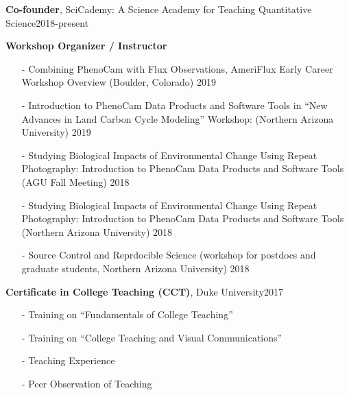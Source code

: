 \documentclass[10pt]{article}
\newenvironment{changemargin}[2]{%
  \begin{list}{}{%
 \setlength{\topsep}{0pt}%
 \setlength{\leftmargin}{#1}%
 \setlength{\rightmargin}{#2}%
 \setlength{\listparindent}{\parindent}%
 \setlength{\itemindent}{\parindent}%
 \setlength{\parsep}{\parskip}%
  }%
  \item[]}{\end{list}
}
\newenvironment{body} {
  \vspace*{-2pt}
  \begin{changemargin}{-0.5in}{-0.5in}
}
{\end{changemargin}
}
\begin{document}
\begin{body}

  \textbf{Co-founder}, SciCademy: A Science Academy for Teaching Quantitative Science\hfill {2018-present}\\
  \medskip

  \textbf {Workshop Organizer / Instructor}\\
  \vspace*{-4pt}
  \begin{itemize} \itemsep -0pt
  
    \item[-] Combining PhenoCam with Flux Observations, AmeriFlux Early Career Workshop Overview (Boulder, Colorado)  \hfill {2019} \smallskip

    \item[-] Introduction to PhenoCam Data Products and Software Tools in ``New Advances in Land Carbon Cycle Modeling'' Workshop:  (Northern Arizona University)  \hfill {2019} \smallskip
    
    \item[-] Studying Biological Impacts of Environmental Change Using Repeat Photography: Introduction to PhenoCam Data Products and Software Tools (AGU Fall Meeting)  \hfill {2018}\smallskip
    \item[-] Studying Biological Impacts of Environmental Change Using Repeat Photography: Introduction to PhenoCam Data Products and Software Tools (Northern Arizona University)  \hfill {2018}\smallskip
    \item[-] Source Control and Reprdocible Science (workshop for postdocs and graduate students, Northern Arizona University)  \hfill {2018}\smallskip
  \end{itemize}
  \medskip

  \textbf{Certificate in College Teaching (CCT)}, Duke University\hfill {2017}\\
  \vspace*{-4pt}
  \begin{itemize} \itemsep -0pt
    \item[-]Training on ``Fundamentals of College Teaching''\\
    \item[-]Training on ``College Teaching and Visual Communications''\\
    \item[-]Teaching Experience
    \item[-]Peer Observation of Teaching \\
  \end{itemize}
  \medskip



\end{body}
\end{document}

